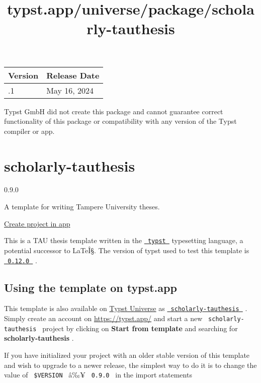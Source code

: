 \begin{longtable}[]{@{}ll@{}}
\toprule\noalign{}
Version & Release Date \\
\midrule\noalign{}
\endhead
\bottomrule\noalign{}
\endlastfoot
0.1.1 & May 16, 2024 \\
\end{longtable}

Typst GmbH did not create this package and cannot guarantee correct
functionality of this package or compatibility with any version of the
Typst compiler or app.


\title{typst.app/universe/package/scholarly-tauthesis}

\label{banner}
\label{template-thumbnail}

\section{scholarly-tauthesis}\label{scholarly-tauthesis}

{ 0.9.0 }

A template for writing Tampere University theses.

\href{/app?template=scholarly-tauthesis&version=0.9.0}{Create project in
app}

\label{readme}
This is a TAU thesis template written in the
\href{https://github.com/typst/typst}{\texttt{\ typst\ }} typesetting
language, a potential successor to LaTeÎ§. The version of typst used to
test this template is
\href{https://github.com/typst/typst/releases/tag/v0.12.0}{\texttt{\ 0.12.0\ }}
.

\subsection{Using the template on
typst.app}\label{using-the-template-on-typst.app}

This template is also available on
\href{https://typst.app/universe}{Typst Universe} as
\href{https://typst.app/universe/package/scholarly-tauthesis}{\texttt{\ scholarly-tauthesis\ }}
. Simply create an account on \url{https://typst.app/} and start a new
\texttt{\ scholarly-tauthesis\ } project by clicking on \textbf{Start
from template} and searching for \textbf{scholarly-tauthesis} .

If you have initialized your project with an older stable version of
this template and wish to upgrade to a newer release, the simplest way
to do it is to change the value of \texttt{\ \$VERSION\ } â‰¥
\texttt{\ 0.9.0\ } in the import statements

